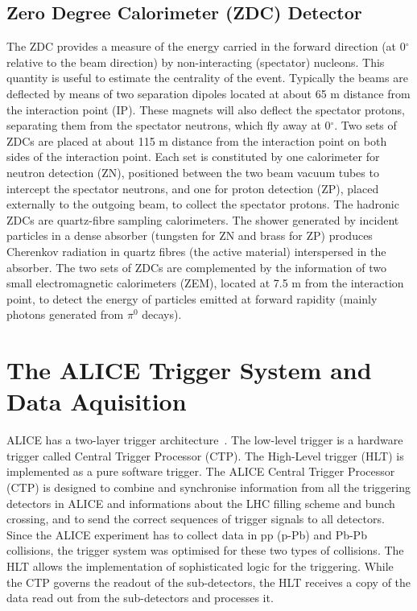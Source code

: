 \subsection{Zero Degree Calorimeter (ZDC) Detector} 
\label{sec:ZDC}
The ZDC provides a measure of the energy carried in the forward direction (at 0$^\circ$ relative
to the beam direction) by non-interacting (spectator) nucleons. This quantity is
useful to estimate the centrality of the event. Typically the beams are deflected by means 
of two separation dipoles located at about 65 m distance from the interaction point (IP). These magnets will also deflect the spectator
 protons, separating them from the spectator neutrons, which fly away at 0$^\circ$. 
Two sets of ZDCs are placed at about 115 m distance from the 
 interaction point on both sides of the interaction point. Each set is constituted by one 
 calorimeter for neutron detection (ZN), positioned between the two 
 beam vacuum tubes to intercept the spectator neutrons, and one for proton detection (ZP), placed externally 
 to the outgoing beam, to collect the spectator protons. 
  The hadronic ZDCs are quartz-fibre sampling calorimeters. The shower generated by incident
particles in a dense absorber (tungsten for ZN and brass for ZP) produces 
Cherenkov radiation in quartz fibres (the active material) interspersed in the absorber.
The two sets of ZDCs are complemented by the information of two small 
electromagnetic calorimeters (ZEM), located at 7.5 m from the interaction
 point, to detect the  energy of particles emitted at forward rapidity (mainly photons generated from $\pi^0$ decays).




\section{The ALICE Trigger System and Data Aquisition}
\label{sec:trigger}
ALICE has a two-layer trigger architecture~\cite{Fabjan:684651}. The low-level trigger is a 
hardware trigger called Central Trigger Processor (CTP). The High-Level trigger (HLT)
 is implemented as a pure software trigger. 
The ALICE Central Trigger Processor (CTP) is designed to combine and synchronise 
information from all the triggering detectors in ALICE and informations about the LHC filling scheme and
bunch crossing, and to send the correct sequences
 of trigger signals to all detectors. Since the ALICE 
 experiment has to collect data in pp (p-Pb) and Pb-Pb collisions, the trigger system was optimised 
 for these two types of collisions. The HLT allows the implementation of sophisticated 
 logic for the triggering. While the CTP governs the readout of the sub-detectors, the 
 HLT receives a copy of the data read out from the sub-detectors and processes it.

